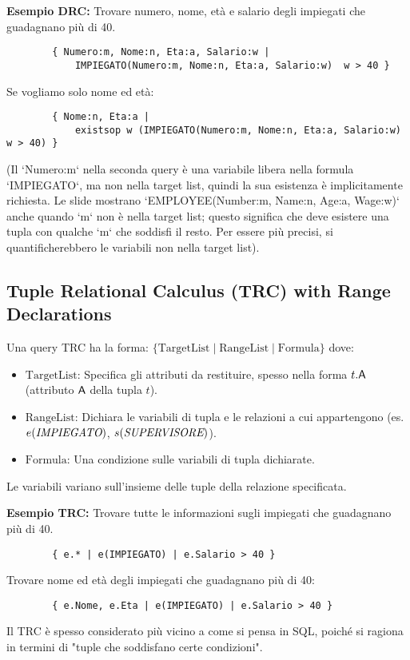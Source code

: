 	\textbf{Esempio DRC:} Trovare numero, nome, età e salario degli impiegati che guadagnano più di 40.
	\begin{verbatim}
		{ Numero:m, Nome:n, Eta:a, Salario:w |
			IMPIEGATO(Numero:m, Nome:n, Eta:a, Salario:w)  w > 40 }
	\end{verbatim}
	Se vogliamo solo nome ed età:
	\begin{verbatim}
		{ Nome:n, Eta:a |
			existsop w (IMPIEGATO(Numero:m, Nome:n, Eta:a, Salario:w)  w > 40) }
	\end{verbatim}
	(Il `Numero:m` nella seconda query è una variabile libera nella formula `IMPIEGATO`, ma non nella target list, quindi la sua esistenza è implicitamente richiesta. Le slide mostrano `EMPLOYEE(Number:m, Name:n, Age:a, Wage:w)` anche quando `m` non è nella target list; questo significa che deve esistere una tupla con qualche `m` che soddisfi il resto. Per essere più precisi, si quantificherebbero le variabili non nella target list).
	
	\subsection{Tuple Relational Calculus (TRC) with Range Declarations}
	Una query TRC ha la forma:
	$\{ \text{TargetList} \mid \text{RangeList} \mid \text{Formula} \}$
	dove:
	\begin{itemize}
		\item $\text{TargetList}$: Specifica gli attributi da restituire, spesso nella forma $t.\textsf{A}$ (attributo $\textsf{A}$ della tupla $t$).
		\item $\text{RangeList}$: Dichiara le variabili di tupla e le relazioni a cui appartengono (es. $e(\textit{IMPIEGATO})$, $s(\textit{SUPERVISORE})$).
		\item $\text{Formula}$: Una condizione sulle variabili di tupla dichiarate.
	\end{itemize}
	Le variabili variano sull'insieme delle tuple della relazione specificata.
	
	\textbf{Esempio TRC:} Trovare tutte le informazioni sugli impiegati che guadagnano più di 40.
	\begin{verbatim}
		{ e.* | e(IMPIEGATO) | e.Salario > 40 }
	\end{verbatim}
	Trovare nome ed età degli impiegati che guadagnano più di 40:
	\begin{verbatim}
		{ e.Nome, e.Eta | e(IMPIEGATO) | e.Salario > 40 }
	\end{verbatim}
	Il TRC è spesso considerato più vicino a come si pensa in SQL, poiché si ragiona in termini di "tuple che soddisfano certe condizioni".
	

